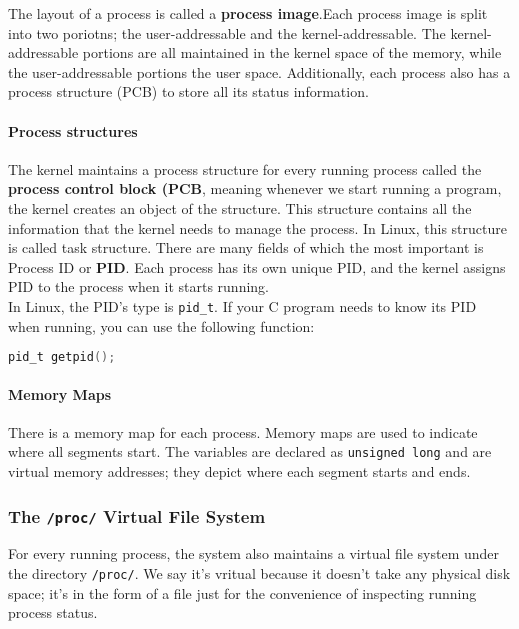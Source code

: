 \documentclass{article}
\newcommand{\bold}[1]{\textbf{#1}}
\newcommand{\code}[1]{\texttt{#1}}
\begin{document}
The layout of a process is called a \bold{process image}.Each process image is split into two poriotns; the user-addressable and the kernel-addressable. The kernel-addressable portions are all maintained in the kernel space of the memory, while the user-addressable portions the user space. Additionally, each process also has a process structure (PCB) to store all its status information. 

\paragraph{Process structures}

The kernel maintains a process structure for every running process called the \bold{process control block (PCB}, meaning whenever we start running a program, the kernel creates an object of the structure. This structure contains all the information that the kernel needs to manage the process. In Linux, this structure is called task structure. There are many fields of which the most important is Process ID or \bold{PID}. Each process has its own unique PID, and the kernel assigns PID to the process when it starts running. \\

In Linux, the PID's type is \code{pid\_t}. If your C program needs to know its PID when running, you can use the following function: 

\begin{lstlisting}[language=C]
pid_t getpid();
\end{lstlisting}

\paragraph{Memory Maps}

There is a memory map for each process. Memory maps are used to indicate where all segments start. The variables are declared as \code{unsigned long} and are virtual memory addresses; they depict where each segment starts and ends. 

\subsubsection{The \code{/proc/} Virtual File System}

For every running process, the system also maintains a virtual file system under the directory \code{/proc/}. We say it's vritual because it doesn't take any physical disk space; it's in the form of a file just for the convenience of inspecting running process status. 
\end{document}
